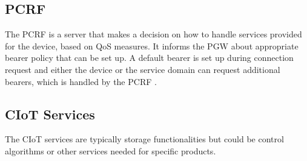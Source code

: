 \subsection{\gls{PCRF}}
The \gls{PCRF} is a server that makes a decision on how to handle services provided for the device, based on \gls{QoS} measures. It informs the \gls{PGW} about appropriate bearer policy that can be set up. A default bearer is set up during connection request and either the device or the service domain can request additional bearers, which is handled by the \gls{PCRF} \citep[ch. 3]{book_LTE_for_UMTS}.

\subsection{\gls{CIoT} Services}
The \gls{CIoT} services are typically storage functionalities but could be control algorithms or other services needed for specific products. 


